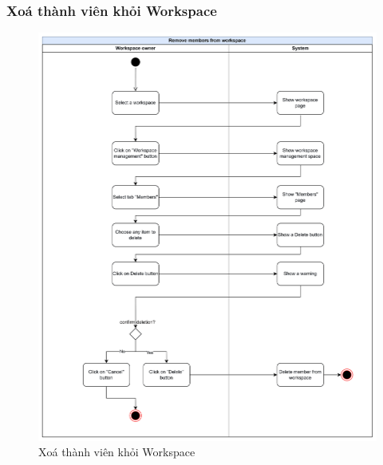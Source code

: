 \subsubsection{Xoá thành viên khỏi Workspace}
    \begin{figure}[H]
        \centering
        \includegraphics[width=\linewidth]{Content/Phân tích và thiết kế hệ thống/documents/Sơ đồ hoạt động/images/removeMemberFromWorkspace.png}
        \vspace{0.5cm}
        \caption{Xoá thành viên khỏi Workspace}
        \label{fig:Xoá thành viên khỏi Workspace}
    \end{figure}
